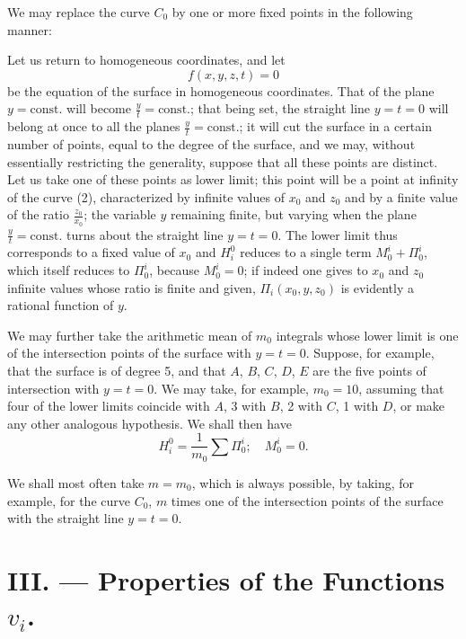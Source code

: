 \documentclass{article}
\begin{document}
We may replace the curve $C_{0}$ by one or more fixed points in the following manner:

Let us return to homogeneous coordinates, and let
\[
f(x, y, z, t) = 0
\]
be the equation of the surface in homogeneous coordinates. That of the plane $y = \text{const.}$ will become $\displaystyle\frac{y}{t} = \text{const.}$; that being set, the straight line $y = t = 0$ will belong at once to all the planes $\displaystyle\frac{y}{t} = \text{const.}$; it will cut the surface in a certain number of points, equal to the degree of the surface, and we may, without essentially restricting the generality, suppose that all these points are distinct. Let us take one of these points as lower limit; this point will be a point at infinity of the curve (2), characterized by infinite values of $x_{0}$ and $z_{0}$ and by a finite value of the ratio
$\displaystyle\frac{z_{0}}{x_{0}}$; the variable $y$ remaining finite, but varying when the plane $\displaystyle\frac{y}{t} = \text{const.}$ turns about the straight line $y = t = 0$. The lower limit thus corresponds to a fixed value of $x_{0}$ and $H_{i}^{0}$ reduces to a single term $M_{0}^{i} + \Pi_{0}^{i}$, which itself reduces to $\Pi_{0}^{i}$, because $M_{0}^{i} = 0$; if indeed one gives to $x_{0}$ and $z_{0}$ infinite values whose ratio is finite and given, $\Pi_{i}(x_{0}, y, z_{0})$ is evidently a rational function of $y$.

We may further take the arithmetic mean of $m_{0}$ integrals whose lower limit is one of the intersection points of the surface with $y = t = 0$. Suppose, for example, that the surface is of degree 5, and that $A$, $B$, $C$, $D$, $E$ are the five points of intersection with $y = t = 0$. We may take, for example, $m_{0} = 10$, assuming that four of the lower limits coincide with $A$, 3 with $B$, 2 with $C$, 1 with $D$, or make any other analogous hypothesis. We shall then have
\[
H_{i}^{0} = \frac{1}{m_{0}} \sum \Pi_{0}^{i}; \quad M_{0}^{i} = 0.
\]

We shall most often take $m = m_{0}$, which is always possible, by taking, for example, for the curve $C_{0}$, $m$ times one of the intersection points of the surface with the straight line $y = t = 0$.

\section*{III. --- Properties of the Functions $v_i$.}
\end{document}
